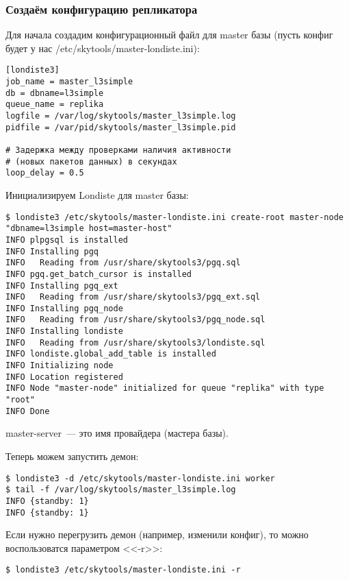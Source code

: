 \subsubsection{Создаём конфигурацию репликатора}
Для начала создадим конфигурационный файл для master базы
(пусть конфиг будет у нас /etc/skytools/master-londiste.ini):
\begin{lstlisting}[label=lst:londiste-replica1,caption=Создаём конфигурацию репликатора]
[londiste3]
job_name = master_l3simple
db = dbname=l3simple
queue_name = replika
logfile = /var/log/skytools/master_l3simple.log
pidfile = /var/pid/skytools/master_l3simple.pid

# Задержка между проверками наличия активности
# (новых пакетов данных) в секундах
loop_delay = 0.5
\end{lstlisting}

Инициализируем Londiste для master базы:

\begin{lstlisting}[label=lst:londiste-replica2,caption=Инициализируем Londiste]
$ londiste3 /etc/skytools/master-londiste.ini create-root master-node "dbname=l3simple host=master-host"
INFO plpgsql is installed
INFO Installing pgq
INFO   Reading from /usr/share/skytools3/pgq.sql
INFO pgq.get_batch_cursor is installed
INFO Installing pgq_ext
INFO   Reading from /usr/share/skytools3/pgq_ext.sql
INFO Installing pgq_node
INFO   Reading from /usr/share/skytools3/pgq_node.sql
INFO Installing londiste
INFO   Reading from /usr/share/skytools3/londiste.sql
INFO londiste.global_add_table is installed
INFO Initializing node
INFO Location registered
INFO Node "master-node" initialized for queue "replika" with type "root"
INFO Done
\end{lstlisting}

master-server~--- это имя провайдера (мастера базы).

Теперь можем запустить демон:

\begin{lstlisting}[label=lst:londiste-replica3,caption=Запускаем демон для master базы]
$ londiste3 -d /etc/skytools/master-londiste.ini worker
$ tail -f /var/log/skytools/master_l3simple.log
INFO {standby: 1}
INFO {standby: 1}
\end{lstlisting}

Если нужно перегрузить демон (например, изменили конфиг), то можно воспользоватся параметром <<-r>>:

\begin{lstlisting}[label=lst:londiste-replica4,caption=Перегрузка демона]
$ londiste3 /etc/skytools/master-londiste.ini -r
\end{lstlisting}

